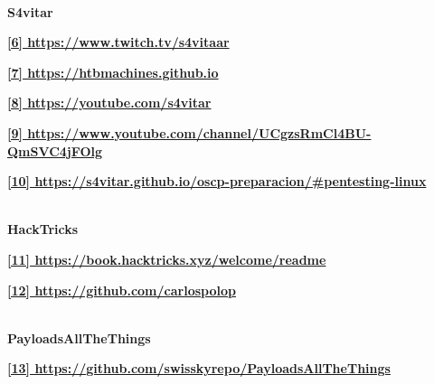 \begin{adjustbox}{width=0.94\paperwidth,center}
\begin{tcolorbox}[colback=blue!5!white,colframe=blue!50!black,
  colbacktitle=blue!75!black,title=Ligazóns,fonttitle=\bfseries\color{white}]
\vspace*{-0.2cm} \DrawLine\\ \hspace*{-0.4cm} \textbf{S4vitar}
    \par 
      \href{https://www.twitch.tv/s4vitaar}{\textbf{\color{blue}[6] https://www.twitch.tv/s4vitaar}}
    \par
      \href{https://htbmachines.github.io}{\textbf{\color{blue}[7] https://htbmachines.github.io}}
    \par
      \href{https://youtube.com/s4vitar}{\textbf{\color{blue}[8] https://youtube.com/s4vitar}}
    \par
      \href{https://www.youtube.com/channel/UCgzsRmCl4BU-QmSVC4jFOlg}{\textbf{\color{blue}[9] https://www.youtube.com/channel/UCgzsRmCl4BU-QmSVC4jFOlg}}
    \par
      \href{https://s4vitar.github.io/oscp-preparacion/\#pentesting-linux}{\textbf{\color{blue}[10] https://s4vitar.github.io/oscp-preparacion/\#pentesting-linux}}
    
  
\vspace*{-0.2cm} \DrawLine\\ \hspace*{-0.4cm} \textbf{HackTricks}
    \par 
      \href{https://book.hacktricks.xyz/welcome/readme}{\textbf{\color{blue}[11] https://book.hacktricks.xyz/welcome/readme}}
    \par
      \href{https://github.com/carlospolop}{\textbf{\color{blue}[12] https://github.com/carlospolop}}
    
  
\vspace*{-0.2cm} \DrawLine\\ \hspace*{-0.4cm} \textbf{PayloadsAllTheThings}

    \par 
      \href{https://github.com/swisskyrepo/PayloadsAllTheThings}{\textbf{\color{blue}[13] https://github.com/swisskyrepo/PayloadsAllTheThings}}
 
\vspace*{-0.2cm}
\end{tcolorbox}
\end{adjustbox}
\vspace*{-2cm}
